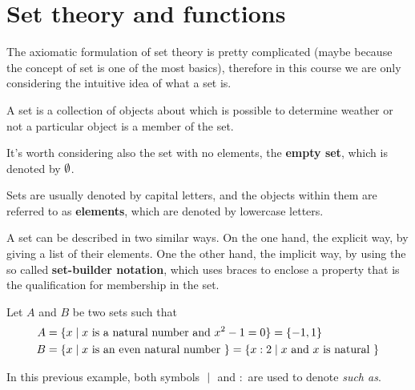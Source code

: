 \chapter{Set theory and functions}
\thispagestyle{noheaders}
The axiomatic formulation of set theory is pretty complicated (maybe because the concept of set is one of the most basics), therefore in this course we are only considering the intuitive idea of what a set is.


\begin{defi}[Set]
    A set is a collection of objects about which is possible to determine weather or not a particular object is a member of the set.
\end{defi}

\begin{note}
    It's worth considering also the set with no elements, the \textbf{empty set}, which is denoted by $\emptyset$.
\end{note}

Sets are usually denoted by capital letters, and the objects within them are referred to as \textbf{elements}, which are denoted by lowercase letters.

A set can be described in two similar ways. On the one hand, the explicit way, by giving a list of their elements. One the other hand, the implicit way, by using the so called \textbf{set-builder notation}, which uses braces to enclose a property that is the qualification for membership in the set.

\begin{example}
    Let $A$ and $B$ be two sets such that
    \begin{align}
        A &= \lbrace x\; | \; x \textrm{ is a natural number and } x^2 - 1 = 0 \rbrace = \lbrace -1, 1\rbrace \\
        B &= \lbrace x\; | \; x \textrm{ is an even natural number } \rbrace = \lbrace x : 2\; | \; x \textrm{ and $x$ is natural } \rbrace
    \end{align}
\end{example}

\begin{notation}
    In this previous example, both symbols $\; | \;$ and $ : $ are used to denote \textit{such as}.
\end{notation}

